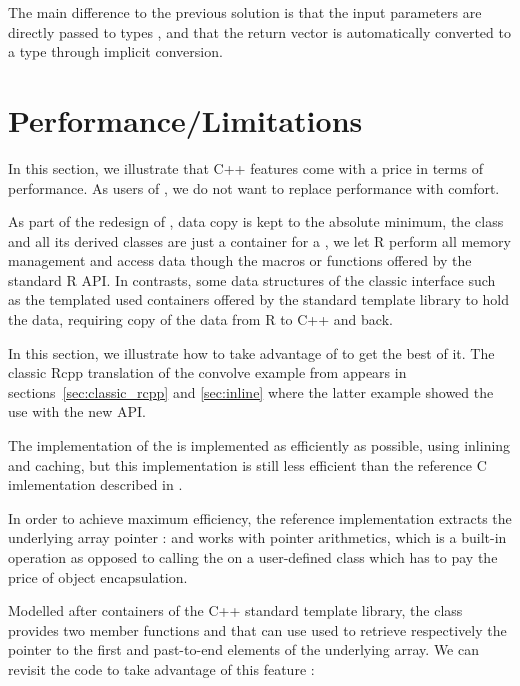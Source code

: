 
The main difference to the previous solution is that the input parameters are
directly passed to types , and that the return
vector is automatically converted to a  type through implicit
conversion.

\section{Performance/Limitations}

In this section, we illustrate that C++ features come with a price
in terms of performance. As users of , we do not want
to replace performance with comfort. 

As part of the redesign of , data copy is kept to the
absolute minimum, the  class and all its derived
classes are just a container for a , we let R perform
all memory management and access data though the macros or functions
offered by the standard R API. In contrasts, some data structures
of the classic  interface such as the templated 
 used containers offered by the standard template
library to hold the data, requiring copy of the data 
from R to C++ and back.

In this section, we illustrate how to take advantage of  to get
the best of it. The classic Rcpp translation of the convolve example from
\cite{R:exts} appears in sections~\ref{sec:classic_rcpp} and
\ref{sec:inline} where the latter example showed the use with the new API.

The implementation of the  is implemented as 
efficiently as possible, using inlining and caching, 
but this implementation is still less efficient than the 
reference C imlementation described in \cite{R:exts}.

In order to achieve maximum efficiency, the reference implementation
extracts the underlying array pointer :  and works 
with pointer arithmetics, which is a built-in operation as opposed to 
calling the  on a user-defined class which has to 
pay the price of object encapsulation.

Modelled after containers of the C++ standard template library, 
the  class provides two member functions 
and  that can use used to retrieve respectively 
the pointer to the first and past-to-end elements of the underlying array.
We can revisit the code to take advantage of this feature : 

